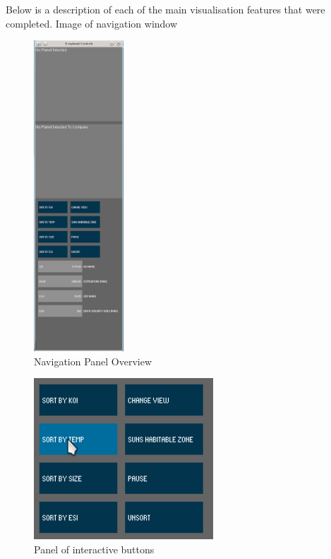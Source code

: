 Below is a description of each of the main visualisation features that were completed.
Image of navigation window

\begin{figure}[h!]
  \centering
      \includegraphics[width=0.3\textwidth]{images/nav.png}
  \caption{Navigation Panel Overview}
  \label{fig:nav}
\end{figure}


\begin{figure}[h!]
  \centering
      \includegraphics[width=0.6\textwidth]{images/buttons.jpg}
  \caption{Panel of interactive buttons}
  \label{fig:buttons}
\end{figure}

